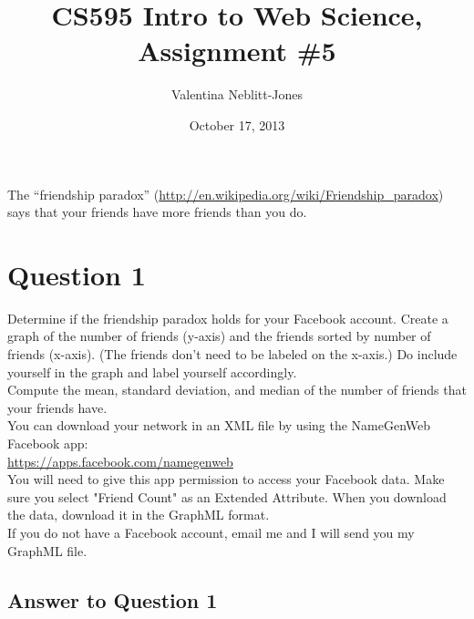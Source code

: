 \documentclass{article}
\begin{document}
\title{CS595 Intro to Web Science, Assignment \#5}
\author{Valentina Neblitt-Jones}
\date{October 17, 2013}
\maketitle

The ``friendship paradox'' (\url{http://en.wikipedia.org/wiki/Friendship_paradox})  says that your friends have more friends than you do. \\

\section*{Question 1}

Determine if the friendship paradox holds for your Facebook account. Create a graph of the number of friends (y-axis) and the friends sorted by number of friends (x-axis). (The friends don't need to be labeled on the x-axis.) Do include yourself in the graph and label yourself accordingly. \\

Compute the mean, standard deviation, and median of the number of friends that your friends have. \\

You can download your network in an XML file by using the NameGenWeb Facebook app:  \\

\url{https://apps.facebook.com/namegenweb} \\

You will need to give this app permission to access your Facebook data. Make sure you select "Friend Count" as an Extended Attribute. When you download the data, download it in the GraphML format. \\

If you do not have a Facebook account, email me and I will send you my GraphML file.

\subsection*{Answer to Question 1}

\end{document}
